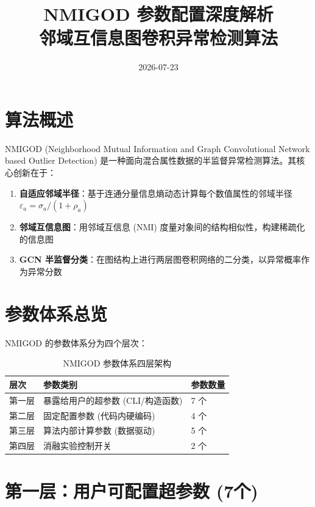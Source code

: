 \documentclass[11pt,a4paper]{ctexart}
\title{\textbf{NMIGOD 参数配置深度解析}\\[6pt]
{\Large 邻域互信息图卷积异常检测算法}}
\author{}
\date{2026-07-23}
\begin{document}
\maketitle
\thispagestyle{fancy}
\tableofcontents
\newpage

\section{算法概述}
NMIGOD (Neighborhood Mutual Information and Graph Convolutional Network based Outlier Detection) 是一种面向混合属性数据的半监督异常检测算法。其核心创新在于：

\begin{enumerate}[leftmargin=*]
    \item \textbf{自适应邻域半径}：基于连通分量信息熵动态计算每个数值属性的邻域半径 $\varepsilon_a = \sigma_a / (1 + \rho_a)$
    \item \textbf{邻域互信息图}：用邻域互信息 (NMI) 度量对象间的结构相似性，构建稀疏化的信息图
    \item \textbf{GCN 半监督分类}：在图结构上进行两层图卷积网络的二分类，以异常概率作为异常分数
\end{enumerate}

\section{参数体系总览}
NMIGOD 的参数体系分为四个层次：

\begin{table}[H]\centering
\caption{NMIGOD 参数体系四层架构}\label{tab:overview}\small
\begin{tabular}{lll}
\toprule
层次 & 参数类别 & 参数数量 \\
\midrule
第一层 & 暴露给用户的超参数 (CLI/构造函数) & 7 个 \\
第二层 & 固定配置参数 (代码内硬编码) & 4 个 \\
第三层 & 算法内部计算参数 (数据驱动) & 5 个 \\
第四层 & 消融实验控制开关 & 2 个 \\
\bottomrule
\end{tabular}\end{table}

\section{第一层：用户可配置超参数 (7个)}
\end{document}
